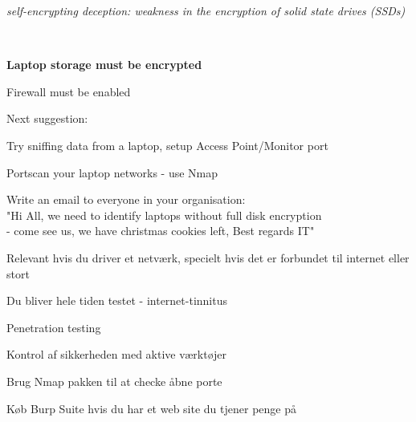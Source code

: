 \documentclass[Screen16to9,17pt]{foils}
\begin{document}

\emph{self-encrypting deception: weakness in the encryption of solid state drives (SSDs)}\\






{~}
\begin{list1}
\item {\bf Laptop storage must be encrypted}
\item Firewall must be enabled
\item Next suggestion:
\begin{list2}
\item Try sniffing data from a laptop, setup Access Point/Monitor port
\item Portscan your laptop networks - use Nmap
\item Write an email to everyone in your organisation:\\
"Hi All, we need to identify laptops without full disk encryption \\
- come see us, we have christmas cookies left, Best regards IT"
\end{list2}
\end{list1}




\begin{list2}
\item Relevant hvis du driver et netværk, specielt hvis det er forbundet til internet eller stort
\item Du bliver hele tiden testet - internet-tinnitus
\item Penetration testing
\item Kontrol af sikkerheden med aktive værktøjer
\item Brug Nmap pakken til at checke åbne porte
\item Køb Burp Suite hvis du har et web site du tjener penge på
\end{list2}



\end{document}
